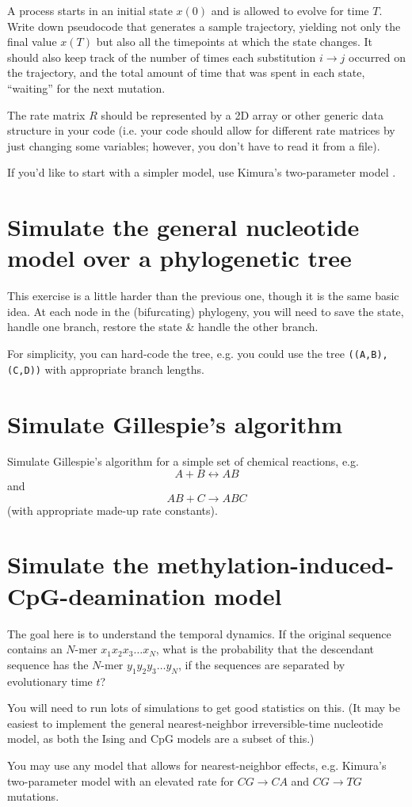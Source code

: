 A process starts in an initial state $x(0)$ and is allowed to evolve for time $T$.
Write down pseudocode that generates a sample trajectory,
yielding not only the final value $x(T)$ but also all the timepoints at which the state changes.
It should also keep track of the number of times each substitution $i \to j$ occurred on the trajectory,
and the total amount of time that was spent in each state, ``waiting'' for the next mutation.

The rate matrix $R$ should be represented by a 2D array or other generic data structure in your code
(i.e. your code should allow for different rate matrices by just changing some variables;
however, you don't have to read it from a file).

If you'd like to start with a simpler model, use Kimura's two-parameter model \cite{Kimura80}.

\section{Simulate the general nucleotide model over a phylogenetic tree}

This exercise is a little harder than the previous one, though it is the same basic idea.
At each node in the (bifurcating) phylogeny, you will need to save the state, handle one branch,
restore the state \& handle the other branch.

For simplicity, you can hard-code the tree, e.g. you could use the tree {\tt ((A,B),(C,D))}
with appropriate branch lengths.

\section{Simulate Gillespie's algorithm}

Simulate Gillespie's algorithm \cite{Gillespie77}
for a simple set of chemical reactions, e.g.
\[
A + B \leftrightarrow AB 
\]
and
\[
AB + C \rightarrow ABC
\]
(with appropriate made-up rate constants).


\section{Simulate the methylation-induced-CpG-deamination model}

The goal here is to understand the temporal dynamics.
If the original sequence contains an $N$-mer $x_1 x_2 x_3 \ldots x_N$,
what is the probability that the descendant sequence has the $N$-mer $y_1 y_2 y_3 \ldots y_N$,
if the sequences are separated by evolutionary time $t$?

You will need to run lots of simulations to get good statistics on this.
(It may be easiest to implement the general nearest-neighbor irreversible-time nucleotide model,
as both the Ising and CpG models are a subset of this.)

You may use any model that allows for nearest-neighbor effects,
e.g. Kimura's two-parameter model \cite{Kimura80}
with an elevated rate for $CG \to CA$ and $CG \to TG$ mutations.
